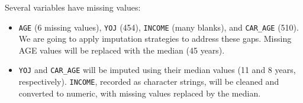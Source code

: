 \documentclass[
]{article}
\newenvironment{Shaded}{\begin{snugshade}}{\end{snugshade}}
\newcommand{\CommentTok}[1]{\textcolor[rgb]{0.56,0.35,0.01}{\textit{#1}}}
\newcommand{\ControlFlowTok}[1]{\textcolor[rgb]{0.13,0.29,0.53}{\textbf{#1}}}
\newcommand{\FunctionTok}[1]{\textcolor[rgb]{0.13,0.29,0.53}{\textbf{#1}}}
\newcommand{\NormalTok}[1]{#1}
\newcommand{\OtherTok}[1]{\textcolor[rgb]{0.56,0.35,0.01}{#1}}
\newcommand{\SpecialCharTok}[1]{\textcolor[rgb]{0.81,0.36,0.00}{\textbf{#1}}}
\newcommand{\StringTok}[1]{\textcolor[rgb]{0.31,0.60,0.02}{#1}}
\begin{document}
Several variables have missing values:

\begin{itemize}
\item
  \texttt{AGE} (6 missing values), \texttt{YOJ} (454), \texttt{INCOME}
  (many blanks), and \texttt{CAR\_AGE} (510). We are going to apply
  imputation strategies to address these gaps. Missing AGE values will
  be replaced with the median (45 years).
\item
  \texttt{YOJ} and \texttt{CAR\_AGE} will be imputed using their median
  values (11 and 8 years, respectively). \texttt{INCOME}, recorded as
  character strings, will be cleaned and converted to numeric, with
  missing values replaced by the median.
\end{itemize}

\begin{Shaded}
\end{Shaded}
\end{document}
